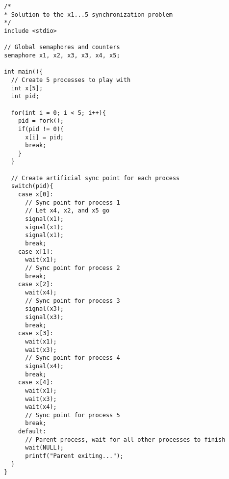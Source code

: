 \documentclass{article}
\begin{document}
\begin{lstlisting}
  /*
  * Solution to the x1...5 synchronization problem
  */
  include <stdio>

  // Global semaphores and counters
  semaphore x1, x2, x3, x3, x4, x5;

  int main(){
    // Create 5 processes to play with
    int x[5];
    int pid;

    for(int i = 0; i < 5; i++){
      pid = fork();
      if(pid != 0){
        x[i] = pid;
        break;
      }
    }

    // Create artificial sync point for each process
    switch(pid){
      case x[0]:
        // Sync point for process 1
        // Let x4, x2, and x5 go
        signal(x1);
        signal(x1);
        signal(x1);
        break;
      case x[1]:
        wait(x1);
        // Sync point for process 2
        break;
      case x[2]:
        wait(x4);
        // Sync point for process 3
        signal(x3);
        signal(x3);
        break;
      case x[3]:
        wait(x1);
        wait(x3);
        // Sync point for process 4
        signal(x4);
        break;
      case x[4]:
        wait(x1);
        wait(x3);
        wait(x4);
        // Sync point for process 5
        break;
      default:
        // Parent process, wait for all other processes to finish
        wait(NULL);
        printf("Parent exiting...");
    }
  }

\end{lstlisting}
\end{document}
